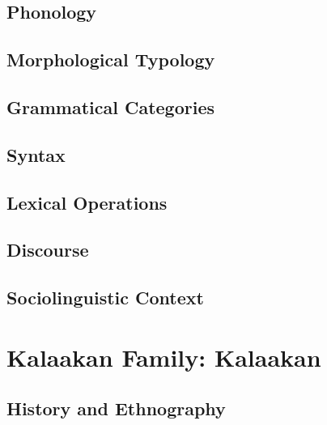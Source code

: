 \documentclass[12pt,letterpaper,openany,twoside]{memoir}
\let\originalpart=\part
\def\part{\cleardoublepage\originalpart}
\begin{document}


\chapter{Phonology}

\chapter{Morphological Typology}

\chapter{Grammatical Categories}

\chapter{Syntax}

\chapter{Lexical Operations}

\chapter{Discourse}

\chapter{Sociolinguistic Context}



\part{Kalaakan Family: Kalaakan}

\chapter{History and Ethnography}
\end{document}
